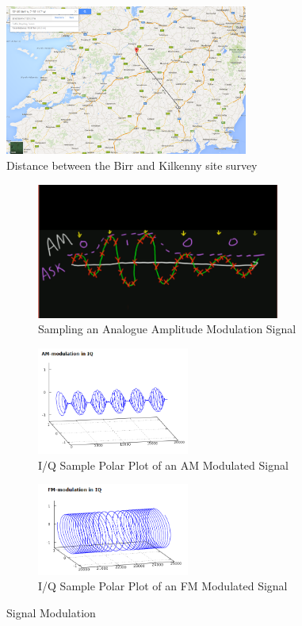 \documentclass[runningheads,a4paper]{llncs}
\begin{document}
%
\begin{figure}[here]
\centering
\includegraphics[width=8cm]{images/36}
\caption{Distance between the Birr and Kilkenny site survey}
\label{fig:site_survey_birr_kilkenny_distance}
\end{figure}
%


%
\begin{figure}	
	\centering
	\begin{subfigure}[t]{8cm}
		\centering
		\includegraphics[width=8cm]{images/46}
		\caption{Sampling an Analogue Amplitude Modulation Signal \citep{ossmann-15-c}}\label{fig:ossmann_am_demodulation}		
	\end{subfigure}
	\quad
	\begin{subfigure}[t]{5cm}
		\centering
		\includegraphics[width=5cm]{images/49}
		\caption{I/Q Sample Polar Plot of an AM Modulated Signal \citep{kuisma-14}}\label{fig:kuisma-iq-am-helix}
	\end{subfigure}
	\quad
	\begin{subfigure}[t]{5cm}
		\centering
		\includegraphics[width=5cm]{images/50}
		\caption{I/Q Sample Polar Plot of an FM Modulated Signal \citep{kuisma-14}}\label{fig:kuisma-iq-fm-helix}
	\end{subfigure}
	\caption{Signal Modulation}\label{fig:signal_modulation}
\end{figure}
%
\end{document}
